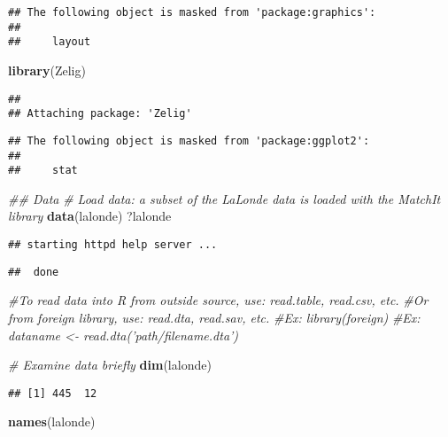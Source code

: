 \documentclass[]{article}
\newenvironment{Shaded}{\begin{snugshade}}{\end{snugshade}}
\newcommand{\CommentTok}[1]{\textcolor[rgb]{0.56,0.35,0.01}{\textit{#1}}}
\newcommand{\KeywordTok}[1]{\textcolor[rgb]{0.13,0.29,0.53}{\textbf{#1}}}
\newcommand{\NormalTok}[1]{#1}
\begin{document}
\begin{verbatim}
## The following object is masked from 'package:graphics':
## 
##     layout
\end{verbatim}

\begin{Shaded}
\begin{Highlighting}[]
\KeywordTok{library}\NormalTok{(Zelig)}
\end{Highlighting}
\end{Shaded}

\begin{verbatim}
## 
## Attaching package: 'Zelig'
\end{verbatim}

\begin{verbatim}
## The following object is masked from 'package:ggplot2':
## 
##     stat
\end{verbatim}

\begin{Shaded}
\begin{Highlighting}[]
\CommentTok{## Data}
\CommentTok{# Load data: a subset of the LaLonde data is loaded with the MatchIt library}
\KeywordTok{data}\NormalTok{(lalonde)}
\NormalTok{?lalonde}
\end{Highlighting}
\end{Shaded}

\begin{verbatim}
## starting httpd help server ...
\end{verbatim}

\begin{verbatim}
##  done
\end{verbatim}

\begin{Shaded}
\begin{Highlighting}[]
\CommentTok{#To read data into R from outside source, use: read.table, read.csv, etc.}
\CommentTok{#Or from foreign library, use: read.dta, read.sav, etc.}
\CommentTok{#Ex: library(foreign)}
\CommentTok{#Ex: dataname <- read.dta('path/filename.dta')}

\CommentTok{# Examine data briefly}
\KeywordTok{dim}\NormalTok{(lalonde)}
\end{Highlighting}
\end{Shaded}

\begin{verbatim}
## [1] 445  12
\end{verbatim}

\begin{Shaded}
\begin{Highlighting}[]
\KeywordTok{names}\NormalTok{(lalonde)}
\end{Highlighting}
\end{Shaded}
\end{document}
